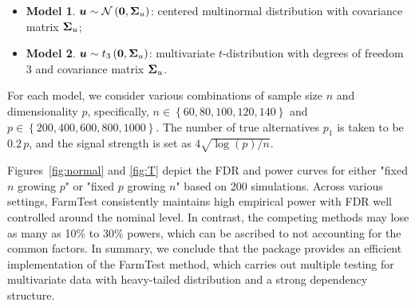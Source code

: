 \begin{itemize}
\item \textbf{Model 1}. $\bm{u} \sim {\cal N}\left(\mathbf{0}, \bm{\Sigma}_u\right)$: centered multinormal distribution with covariance matrix $\bm{\Sigma}_u$;
\item \textbf{Model 2}. $\bm{u} \sim  t_{3}\left(\mathbf{0}, \bm{\Sigma}_u\right)$: multivariate $t$-distribution with degrees of freedom 3 and covariance matrix $\bm{\Sigma}_u$.
\end{itemize}

For each  model, we consider various combinations of sample size $n$ and dimensionality $p$, specifically, $n \in \left\{60, 80, 100, 120, 140\right\}$ and $p \in \left\{200, 400, 600, 800, 1000\right\}$. The number of true alternatives $p_1$ is taken to be $0.2\, p$, and the signal strength is set as $4 \sqrt{\log\left(p\right) / n}$.


Figures~\ref{fig:normal} and \ref{fig:T} depict the FDR and power curves for either "fixed $n$ growing $p$" or "fixed $p$ growing $n$" based on 200 simulations.
Across various settings, FarmTest consistently maintains high empirical power with   FDR well controlled around the nominal level.
In contrast, the competing methods may lose as many as 10\% to 30\% powers, which can be ascribed to not accounting for the common factors.
 In summary, we conclude that the  package provides an efficient implementation of the FarmTest method, which carries out multiple testing for multivariate data with heavy-tailed distribution and a strong dependency structure.


